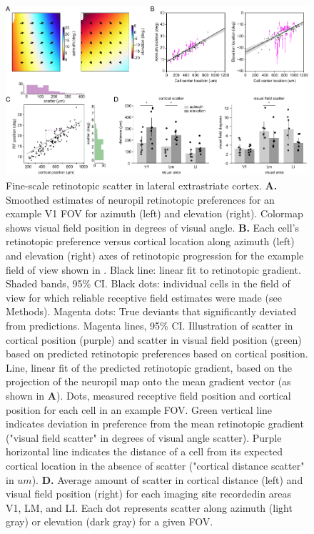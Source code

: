 \begin{figure}[t!]
    \includegraphics[width=\textwidth]{figures/chapter_3/fig_3-3_retino_scatter/fig_3-3_retino_scatter.pdf}
    \vspace{.1in}
    \caption[Fine-scale retinotopic scatter]{Fine-scale retinotopic scatter in lateral extrastriate cortex. 
    \textbf{A.} Smoothed estimates of neuropil retinotopic preferences for an example V1 FOV for azimuth (left) and elevation (right). Colormap shows visual field position in degrees of visual angle.
    \textbf{B.} Each cell's retinotopic preference versus cortical location along azimuth (left) and elevation (right) axes of retinotopic progression for the example field of view shown in . Black line: linear fit to retinotopic gradient. Shaded bands, 95\% CI. Black dots: individual cells in the field of view for which reliable receptive field estimates were made (see Methods). Magenta dots: True deviants that significantly deviated from predictions. Magenta lines, 95\% CI. 
     Illustration of scatter in cortical position (purple) and scatter in visual field position (green) based on predicted retinotopic preferences based on cortical position. Line, linear fit of the predicted retinotopic gradient, based on the projection of the neuropil map onto the mean gradient vector (as shown in \textbf{A}). Dots, measured receptive field position and cortical position for each cell in an example FOV. Green vertical line indicates deviation in preference from the mean retinotopic gradient ("visual field scatter" in degrees of visual angle scatter). Purple horizontal line indicates the distance of a cell from its expected cortical location in the absence of scatter ("cortical distance scatter" in $um$). 
    \textbf{D.} Average amount of scatter in cortical distance (left) and visual field position (right) for each imaging site recordedin areas V1, LM, and LI. Each dot represents scatter along azimuth (light gray) or elevation (dark gray) for a given FOV.
    \label{fig:retino_scatter}}
\end{figure}

